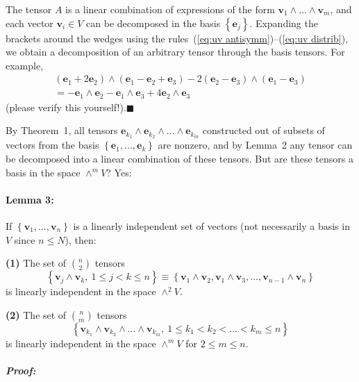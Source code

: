 The tensor $A$ is a linear combination of expressions of the form
$\mathbf{v}_{1}\wedge...\wedge\mathbf{v}_{m}$, and each vector $\mathbf{v}_{i}\in V$
can be decomposed in the basis $\left\{ \mathbf{e}_{j}\right\} $.
Expanding the brackets around the wedges using the rules~(\ref{eq:uv antisymm})--(\ref{eq:uv distrib}),
we obtain a decomposition of an arbitrary tensor through the basis
tensors. For example, \begin{align*}
\left(\mathbf{e}_{1}+2\mathbf{e}_{2}\right)\wedge\left(\mathbf{e}_{1}-\mathbf{e}_{2}+\mathbf{e}_{3}\right)-2\left(\mathbf{e}_{2}-\mathbf{e}_{3}\right)\wedge\left(\mathbf{e}_{1}-\mathbf{e}_{3}\right)\\
=-\mathbf{e}_{1}\wedge\mathbf{e}_{2}-\mathbf{e}_{1}\wedge\mathbf{e}_{3}+4\mathbf{e}_{2}\wedge\mathbf{e}_{3}\end{align*}
(please verify this yourself!).\hfill{}$\blacksquare$

By Theorem~1, all tensors $\mathbf{e}_{k_{1}}\wedge\mathbf{e}_{k_{2}}\wedge...\wedge\mathbf{e}_{k_{m}}$
constructed out of subsets of vectors from the basis $\left\{ \mathbf{e}_{1},...,\mathbf{e}_{k}\right\} $
are nonzero, and by Lemma~2 any tensor can be decomposed into a linear
combination of these tensors. But are these tensors a basis in the
space $\wedge^{m}V$? Yes:


\paragraph{Lemma 3:}

If $\left\{ \mathbf{v}_{1},...,\mathbf{v}_{n}\right\} $ is a linearly
independent set of vectors (not necessarily a basis in $V$ since
$n\leq N$), then:

\textbf{(1)} The set of ${n \choose 2}$ tensors\[
\left\{ \mathbf{v}_{j}\wedge\mathbf{v}_{k},\:1\leq j<k\leq n\right\} \equiv\left\{ \mathbf{v}_{1}\wedge\mathbf{v}_{2},\mathbf{v}_{1}\wedge\mathbf{v}_{3},...,\mathbf{v}_{n-1}\wedge\mathbf{v}_{n}\right\} \]
is linearly independent in the space $\wedge^{2}V$. 

\textbf{(2)} The set of ${n \choose m}$ tensors\[
\left\{ \mathbf{v}_{k_{1}}\wedge\mathbf{v}_{k_{2}}\wedge...\wedge\mathbf{v}_{k_{m}},\:1\leq k_{1}<k_{2}<...<k_{m}\leq n\right\} \]
 is linearly independent in the space $\wedge^{m}V$ for $2\leq m\leq n$.


\subparagraph{Proof:}

